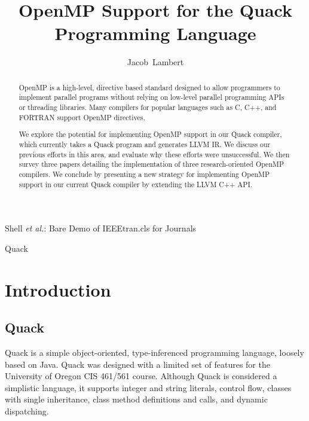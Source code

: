 \documentclass[11pt,journal]{IEEEtran}
\begin{document}
%
\title{OpenMP Support for the Quack Programming Language}


\author{Jacob~Lambert}



%
{Shell \MakeLowercase{\textit{et al.}}: Bare Demo of IEEEtran.cls for Journals}



\maketitle


\begin{abstract}
 OpenMP is a high-level, directive based standard designed to allow
  programmers to implement parallel programs without relying on
  low-level parallel programming APIs or threading libraries. Many compilers
  for popular languages such as C, C++, and FORTRAN support OpenMP directives.

  We explore the potential for implementing OpenMP support in our Quack compiler, which
  currently takes a Quack program and generates LLVM IR.
  We discuss our previous efforts in this area, and evaluate why these efforts were
  unsuccessful. We then survey three papers  detailing the implementation of three
  research-oriented OpenMP compilers. We conclude by presenting a new strategy
  for implementing OpenMP support in our current Quack compiler by extending the
  LLVM C++ API. 
\end{abstract}

\begin{IEEEkeywords}
Quack 
\end{IEEEkeywords}


\IEEEpeerreviewmaketitle


\section{Introduction}

\subsection{Quack}
Quack \cite{quack} is a simple object-oriented, type-inferenced programming language, loosely based
    on Java. Quack was designed with a limited set of features for the University of
    Oregon CIS 461/561 course. Although Quack is considered a simplistic language, it
    supports integer and string literals, control flow, classes with single inheritance,
    class method definitions and calls, and dynamic dispatching.
\end{document}
